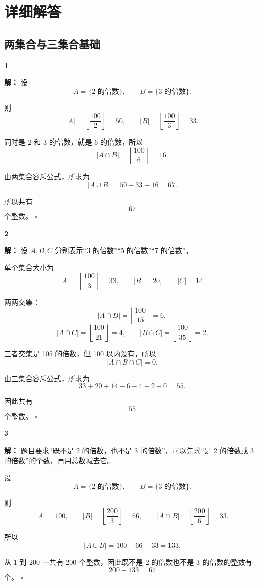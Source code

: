 \documentclass[11pt,a4paper,fontset=fandol]{ctexart}
\theoremstyle{formalexample}
\newenvironment{solution}{\par\noindent\textbf{解：}}{\hfill$\square$\par}
\begin{document}
\newpage
\appendix
\section{详细解答}

\subsection*{两集合与三集合基础}

\textbf{1}\begin{solution}
设
\[
A=\{\text{2 的倍数}\},\qquad B=\{\text{3 的倍数}\}.
\]

则
\[
|A|=\left\lfloor\frac{100}{2}\right\rfloor=50,
\qquad
|B|=\left\lfloor\frac{100}{3}\right\rfloor=33.
\]

同时是 2 和 3 的倍数，就是 6 的倍数，所以
\[
|A\cap B|=\left\lfloor\frac{100}{6}\right\rfloor=16.
\]

由两集合容斥公式，所求为
\[
|A\cup B|=50+33-16=67.
\]

所以共有
\[
67
\]
个整数。
\end{solution}

\textbf{2}\begin{solution}
设 $A,B,C$ 分别表示“3 的倍数”“5 的倍数”“7 的倍数”。

单个集合大小为
\[
|A|=\left\lfloor\frac{100}{3}\right\rfloor=33,
\qquad
|B|=20,
\qquad
|C|=14.
\]

两两交集：
\[
|A\cap B|=\left\lfloor\frac{100}{15}\right\rfloor=6,
\]
\[
|A\cap C|=\left\lfloor\frac{100}{21}\right\rfloor=4,
\qquad
|B\cap C|=\left\lfloor\frac{100}{35}\right\rfloor=2.
\]

三者交集是 105 的倍数，但 100 以内没有，所以
\[
|A\cap B\cap C|=0.
\]

由三集合容斥公式，所求为
\[
33+20+14-6-4-2+0=55.
\]

因此共有
\[
55
\]
个整数。
\end{solution}

\textbf{3}\begin{solution}
题目要求“既不是 2 的倍数，也不是 3 的倍数”，可以先求“是 2 的倍数或 3 的倍数”的个数，再用总数减去它。

设
\[
A=\{\text{2 的倍数}\},\qquad B=\{\text{3 的倍数}\}.
\]

则
\[
|A|=100,
\qquad
|B|=\left\lfloor\frac{200}{3}\right\rfloor=66,
\qquad
|A\cap B|=\left\lfloor\frac{200}{6}\right\rfloor=33.
\]

所以
\[
|A\cup B|=100+66-33=133.
\]

从 1 到 200 一共有 200 个整数，因此既不是 2 的倍数也不是 3 的倍数的整数有
\[
200-133=67
\]
个。
\end{solution}
\end{document}
